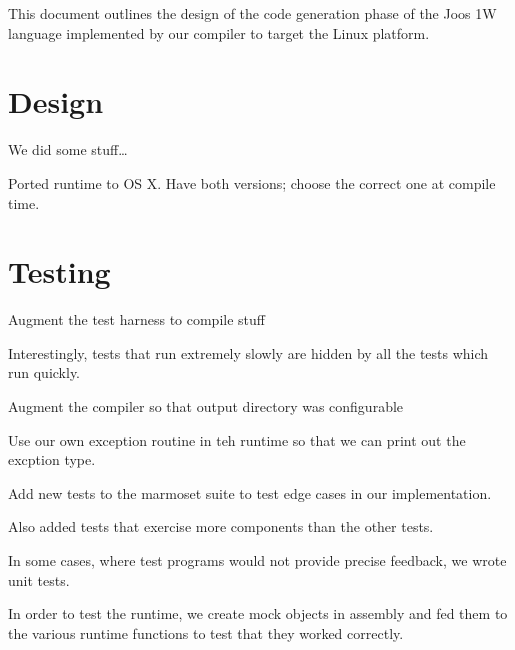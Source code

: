 \documentclass[pdftex,11pt,a4paper]{article}
\begin{document}

This document outlines the design of the code generation phase of
the Joos 1W language implemented by our compiler to target the
 Linux platform.


\section{Design}

We did some stuff\ldots

Ported runtime to OS X. Have both versions; choose the correct one at
compile time.


\section{Testing}

Augment the test harness to compile stuff

Interestingly, tests that run extremely slowly are hidden by all the
tests which run quickly.

Augment the compiler so that output directory was configurable

Use our own exception routine in teh runtime so that we can print out
the excption type.

Add new tests to the marmoset suite to test edge cases in our
implementation.

Also added tests that exercise more components than the other tests.

In some cases, where test programs would not provide precise feedback,
we wrote unit tests.

In order to test the runtime, we create mock objects in assembly and
fed them to the various runtime functions to test that they worked
correctly.
\end{document}

